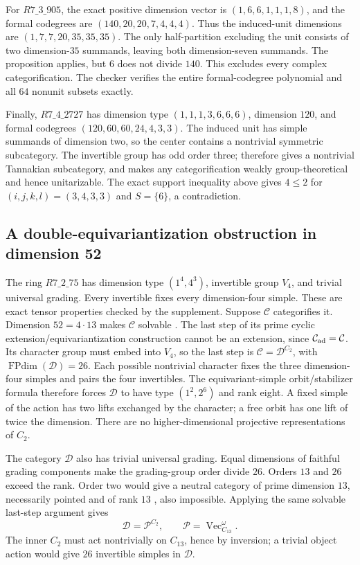 \documentclass[11pt]{article}
\newcommand{\FPdim}{\operatorname{FPdim}}
\begin{document}
For $R7\_3\_905$, the exact positive dimension vector is
$(1,6,6,1,1,1,8)$, and the formal codegrees are
$(140,20,20,7,4,4,4)$. Thus the induced-unit dimensions are
$(1,7,7,20,35,35,35)$. The only half-partition excluding the unit
consists of two dimension-$35$ summands, leaving both dimension-seven
summands. The proposition applies, but $6$ does not divide $140$.
This excludes every complex categorification. The checker verifies the
entire formal-codegree polynomial and all $64$ nonunit subsets exactly.

Finally, $R7\_4\_2727$ has dimension type $(1,1,1,3,6,6,6)$,
dimension $120$, and formal codegrees $(120,60,60,24,4,3,3)$.
The induced unit has simple summands of dimension two, so the center
contains a nontrivial symmetric subcategory. The invertible group has
odd order three; \cite[Lemma~2.5]{Dai120} therefore gives a nontrivial
Tannakian subcategory, and \cite[Lemma~3.1]{Dai120} makes any
categorification weakly group-theoretical and hence unitarizable.
The exact support inequality above gives $4\leq2$ for
$(i,j,k,l)=(3,4,3,3)$ and $S=\{6\}$, a contradiction.

\subsection{A double-equivariantization obstruction in dimension 52}
The ring $R7\_2\_75$ has dimension type $(1^4,4^3)$, invertible group
$V_4$, and trivial universal grading. Every invertible fixes every
dimension-four simple. These are exact tensor properties checked by the
supplement. Suppose $\mathcal C$ categorifies it. Dimension $52=4\cdot13$
makes $\mathcal C$ solvable \cite[Theorem~1.6]{ENOSolvable}. The last
step of its prime cyclic extension/equivariantization construction
\cite[Proposition~4.4]{ENOSolvable} cannot be an extension, since
$\mathcal C_{\rm ad}=\mathcal C$. Its character group must embed into
$V_4$, so the last step is
$\mathcal C=\mathcal D^{C_2}$, with $\FPdim(\mathcal D)=26$.
Each possible nontrivial character fixes the three dimension-four
simples and pairs the four invertibles. The equivariant-simple
orbit/stabilizer formula \cite[Proposition~4.26]{DGNO} therefore forces
$\mathcal D$ to have type $(1^2,2^6)$ and rank eight. A fixed simple of
the action has two lifts exchanged by the character; a free orbit has
one lift of twice the dimension. There are no higher-dimensional
projective representations of $C_2$.

The category $\mathcal D$ also has trivial universal grading. Equal
dimensions of faithful grading components \cite[Proposition~8.20]{ENO}
make the grading-group order divide $26$. Orders $13$ and $26$ exceed
the rank. Order two would give a neutral category of prime dimension
$13$, necessarily pointed and of rank $13$
\cite[Corollary~8.30]{ENO}, also impossible. Applying the same solvable
last-step argument gives
\[
 \mathcal D=\mathcal P^{C_2},\qquad
 \mathcal P=\operatorname{Vec}_{C_{13}}^\omega.
\]
The inner $C_2$ must act nontrivially on $C_{13}$, hence by inversion;
a trivial object action would give $26$ invertible simples in $\mathcal D$.
\end{document}
